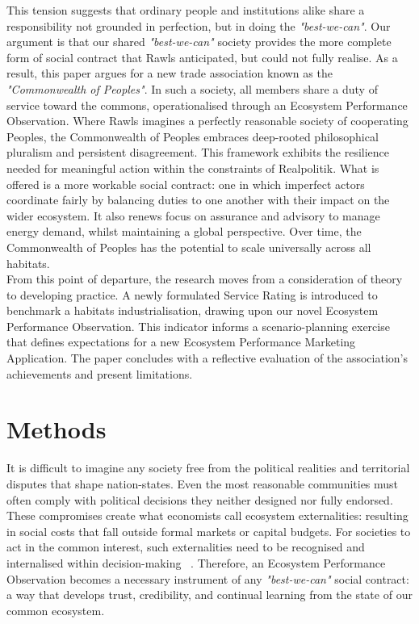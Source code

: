 This tension suggests that ordinary people and institutions alike share a responsibility not grounded in perfection, but in doing the \emph{"best-we-can"}.
Our argument is that our shared \emph{"best-we-can"} society provides the more complete form of social contract that Rawls anticipated, but could not fully realise.
As a result, this paper argues for a new trade association known as the \emph{"Commonwealth of Peoples"}.
In such a society, all members share a duty of service toward the commons, operationalised through an Ecosystem Performance Observation.
Where Rawls imagines a perfectly reasonable society of cooperating Peoples, the Commonwealth of Peoples embraces deep-rooted philosophical pluralism and persistent disagreement.
This framework exhibits the resilience needed for meaningful action within the constraints of Realpolitik.
What is offered is a more workable social contract: one in which imperfect actors coordinate fairly by balancing duties to one another with their impact on the wider ecosystem.
It also renews focus on assurance and advisory to manage energy demand, whilst maintaining a global perspective.
Over time, the Commonwealth of Peoples has the potential to scale universally across all habitats.\\

From this point of departure, the research moves from a consideration of theory to developing practice.
A newly formulated Service Rating is introduced to benchmark a habitats industrialisation, drawing upon our novel Ecosystem Performance Observation.
This indicator informs a scenario-planning exercise that defines expectations for a new Ecosystem Performance Marketing Application.
The paper concludes with a reflective evaluation of the association's achievements and present limitations.\\

\section{Methods}

It is difficult to imagine any society free from the political realities and territorial disputes that shape nation-states.
Even the most reasonable communities must often comply with political decisions they neither designed nor fully endorsed.
These compromises create what economists call ecosystem externalities: resulting in social costs that fall outside formal markets or capital budgets.
For societies to act in the common interest, such externalities need to be recognised and internalised within decision-making ~\cite{rc1}.
Therefore, an Ecosystem Performance Observation becomes a necessary instrument of any \emph{"best-we-can"} social contract: a way that develops trust, credibility, and continual learning from the state of our common ecosystem.\\

